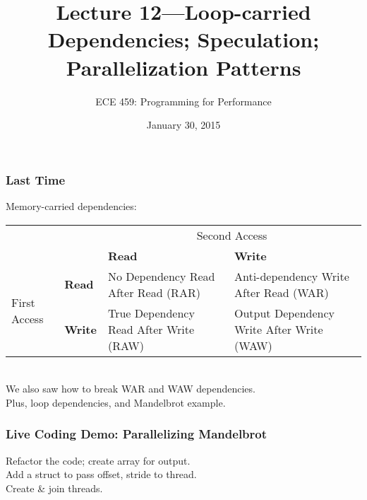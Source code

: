 \documentclass[aspectratio=43]{beamer}
\title{Lecture 12---Loop-carried Dependencies; Speculation; Parallelization Patterns}
\subtitle{ECE 459: Programming for Performance}
\date{January 30, 2015}
\newenvironment{changemargin}[1]{%
  \begin{list}{}{%
    \setlength{\topsep}{0pt}%
    \setlength{\leftmargin}{#1}%
    \setlength{\rightmargin}{1em}
    \setlength{\listparindent}{\parindent}%
    \setlength{\itemindent}{\parindent}%
    \setlength{\parsep}{\parskip}%
  }%
  \item[]}{\end{list}}
\begin{document}
\begin{frame}[plain]
  \titlepage
\end{frame}

\begin{frame}
  \frametitle{Last Time}

  \begin{changemargin}{1.5cm}
    Memory-carried dependencies:
  \end{changemargin}
\begin{center}
\begin{tabular}{ll|p{2.8cm}p{3.2cm}}
& & \multicolumn{2}{c}{Second Access} \\ 
&  & \bf Read & \bf Write \\ \hline
\multirow{2}{*}{First Access} & \bf Read & No Dependency Read After Read (RAR)  & Anti-dependency Write After Read (WAR) \\[0.5em]
& \bf Write & True Dependency Read After Write (RAW) & Output Dependency Write After Write (WAW) \\
\end{tabular}
\end{center}
  \begin{changemargin}{1.5cm}
     ~\\
    We also saw how to break WAR and WAW dependencies.\\[1em]
    Plus, loop dependencies, and Mandelbrot example.
  \end{changemargin}
\end{frame}

\begin{frame}[fragile]
  \frametitle{Live Coding Demo: Parallelizing Mandelbrot}

  \begin{changemargin}{1.5cm}
    Refactor the code; create array for output.\\[1em]
    Add a struct to pass offset, stride to thread.\\[1em]
    Create \& join threads.
  \end{changemargin}

\end{frame}

\end{document}

